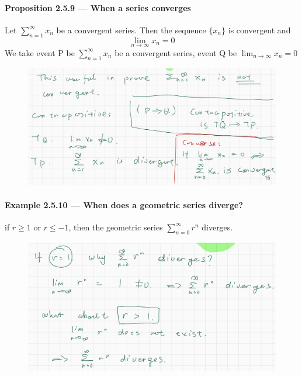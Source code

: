 \documentclass{article}
\begin{document}
\paragraph{Proposition 2.5.9 — When a series converges}
Let $\sum_{n=1}^{\infty}x_n$ be a convergent series. Then the sequence $\{x_n\}$ is convergent and $$\lim_{n\to \infty}x_n=0$$
We take event P be $\sum_{n=1}^{\infty}x_n$ be a convergent series, event Q be $\lim_{n\to \infty}x_n=0$
\begin{figure}[H]
    \centering
    \includegraphics{0140}
\end{figure}
\paragraph{Example 2.5.10 — When does a geometric series diverge?}
if $r\ge 1$ or $r\leq -1$, then the geometric series $\sum_{n=0}^{\infty}r^n$ diverges.
\begin{figure}[H]
    \centering
    \includegraphics{0141}
\end{figure}
\end{document}
